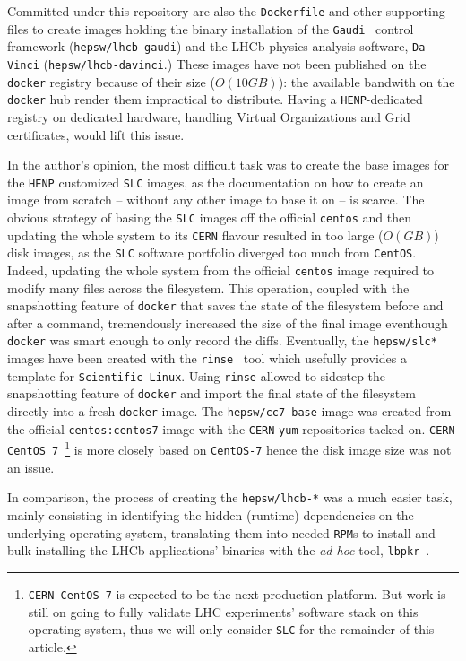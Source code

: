 \documentclass[a4paper]{jpconf}
\begin{document}
Committed under this repository are also the \texttt{Dockerfile} and other
supporting files to create images holding the binary installation of the
\texttt{Gaudi}~\cite{ref-gaudi} control framework (\texttt{hepsw/lhcb-gaudi}) and the LHCb
physics analysis software, \texttt{Da Vinci} (\texttt{hepsw/lhcb-davinci}.)
These images have not been published on the \texttt{docker} registry because of
their size ($O(10 GB)$): the available bandwith on the \texttt{docker} hub
render them impractical to distribute.
Having a \texttt{HENP}-dedicated registry on dedicated hardware, handling
Virtual Organizations and Grid certificates, would lift this issue.

In the author's opinion, the most difficult task was to create the base images
for the \texttt{HENP} customized \texttt{SLC} images, as the documentation on
how to create an image from scratch -- without any other image to base it on
-- is scarce.
The obvious strategy of basing the \texttt{SLC} images off the official
\texttt{centos} and then updating the whole system to its \texttt{CERN} flavour
resulted in too large ($O(GB)$) disk images, as the \texttt{SLC} software
portfolio diverged too much from \texttt{CentOS}.
Indeed, updating the whole system from the official \texttt{centos} image required to
modify many files across the filesystem.
This operation, coupled with the snapshotting feature of \texttt{docker} that saves
the state of the filesystem before and after a command, tremendously increased
the size of the final image eventhough \texttt{docker} was smart enough to only
record the diffs.
Eventually, the \texttt{hepsw/slc*} images have been created with the
\texttt{rinse}~\cite{ref-rinse} tool which usefully provides a template for
\texttt{Scientific Linux}.
Using \texttt{rinse} allowed to sidestep the snapshotting feature of
\texttt{docker} and import the final state of the filesystem directly
into a fresh \texttt{docker} image.
The \texttt{hepsw/cc7-base} image was created from the official
\texttt{centos:centos7} image with the \texttt{CERN} \texttt{yum} repositories
tacked on.
\texttt{CERN CentOS 7}~\footnote{\texttt{CERN CentOS 7} is expected to be the
next production platform.
But work is still on going to fully validate LHC experiments' software stack on
this operating system, thus we will only consider \texttt{SLC} for the remainder of this article.} is more closely based on \texttt{CentOS-7} hence the
disk image size was not an issue.

In comparison, the process of creating the \texttt{hepsw/lhcb-*} was a much
easier task, mainly consisting in identifying the hidden (runtime) dependencies
on the underlying operating system, translating them into needed
\texttt{RPM}s to install and bulk-installing the LHCb applications' binaries
with the \emph{ad hoc} tool, \texttt{lbpkr}~\cite{ref-lbpkr}.
\end{document}
